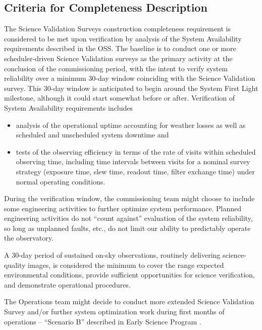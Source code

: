 \subsection{Criteria for Completeness Description}

The Science Validation Surveys construction completeness requirement is considered to be met upon verification by analysis of the System Availability requirements described in the OSS.
The baseline is to conduct one or more scheduler-driven Science Validation surveys as the primary activity at the conclusion of the commissioning period, with the intent to verify system reliability over a minimum 30-day window coinciding with the Science Validation survey. This 30-day window is anticipated to begin around the System First Light milestone, although it could start somewhat before or after.
Verification of System Availability requirements includes

\begin{itemize}
        \item analysis of the operational uptime accounting for weather losses as well as scheduled and unscheduled system downtime and
        \item tests of the observing efficiency in terms of the rate of visits within scheduled observing time, including time intervals between visits for a nominal survey strategy (exposure time, slew time, readout time, filter exchange time) under normal operating conditions.
\end{itemize}

During the verification window, the commissioning team might choose to include some engineering activities to further optimize system performance. Planned engineering activities do not ``count against'' evaluation of the system reliability, so long as unplanned faults, etc., do not limit our ability to predictably operate the observatory.

A 30-day period of sustained on-sky observations, routinely delivering science-quality images, is considered the minimum to cover the range expected environmental conditions, provide sufficient opportunities for science verification, and demonstrate operational procedures.

The Operations team might decide to conduct more extended Science Validation Survey and/or further system optimization work during first months of operations – ``Scenario B'' described in Early Science Program .


